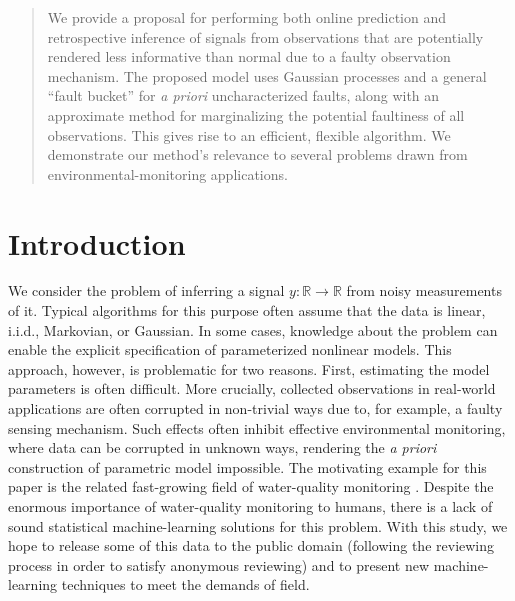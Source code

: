 \documentclass{article}
\newcommand{\R}{\ensuremath{\mathbb{R}}}
\begin{document}

\begin{abstract}
  We provide a proposal for performing both online prediction and
  retrospective inference of signals from observations that are
  potentially rendered less informative than normal due to a faulty
  observation mechanism.  The proposed model uses Gaussian processes
  and a general ``fault bucket'' for \textit{a priori} uncharacterized
  faults, along with an approximate method for marginalizing the
  potential faultiness of all observations. This gives rise to an
  efficient, flexible algorithm. We demonstrate our method's relevance
  to several problems drawn from environmental-monitoring
  applications.
\end{abstract}

\section{Introduction}

We consider the problem of inferring a signal $y\colon \R \to \R$ from
noisy measurements of it.  Typical algorithms for this purpose often
assume that the data is linear, i.i.d., Markovian, or Gaussian. In
some cases, knowledge about the problem can enable the explicit
specification of parameterized nonlinear models. This approach,
however, is problematic for two reasons. First, estimating the model
parameters is often difficult. More crucially, collected observations
in real-world applications are often corrupted in non-trivial ways due
to, for example, a faulty sensing mechanism. Such effects often
inhibit effective environmental monitoring, where data can be
corrupted in unknown ways, rendering the \emph{a priori} construction
of parametric model impossible. The motivating example for this paper
is the related fast-growing field of water-quality monitoring
\citep{wagner2006guidelines}. Despite the enormous importance of
water-quality monitoring to humans, there is a lack of sound
statistical machine-learning solutions for this problem. With this
study, we hope to release some of this data to the public domain
(following the reviewing process in order to satisfy anonymous
reviewing) and to present new machine-learning techniques to meet the
demands of field.
\end{document}
